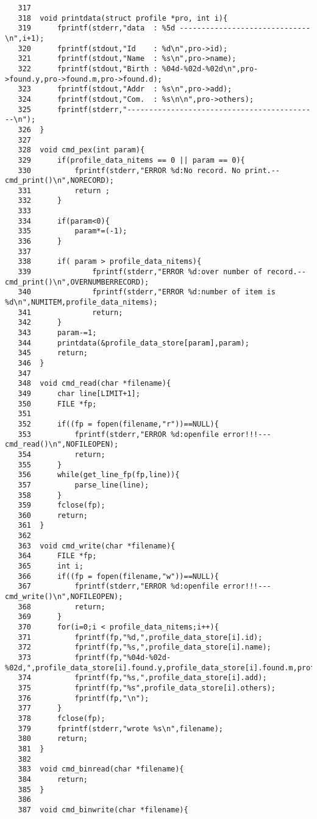 \documentclass[a4j,11pt]{jarticle}
\begin{document}
{\begin{verbatim}
   317	
   318	void printdata(struct profile *pro, int i){
   319	    fprintf(stderr,"data  : %5d ------------------------------\n",i+1);
   320	    fprintf(stdout,"Id    : %d\n",pro->id);
   321	    fprintf(stdout,"Name  : %s\n",pro->name);
   322	    fprintf(stdout,"Birth : %04d-%02d-%02d\n",pro->found.y,pro->found.m,pro->found.d);
   323	    fprintf(stdout,"Addr  : %s\n",pro->add);
   324	    fprintf(stdout,"Com.  : %s\n\n",pro->others);
   325	    fprintf(stderr,"--------------------------------------------\n");
   326	}
   327	
   328	void cmd_pex(int param){
   329	    if(profile_data_nitems == 0 || param == 0){
   330	        fprintf(stderr,"ERROR %d:No record. No print.--cmd_print()\n",NORECORD);
   331	        return ;
   332	    }
   333	
   334	    if(param<0){
   335	        param*=(-1);
   336	    }
   337	
   338	    if( param > profile_data_nitems){
   339	            fprintf(stderr,"ERROR %d:over number of record.--cmd_print()\n",OVERNUMBERRECORD);
   340	            fprintf(stderr,"ERROR %d:number of item is %d\n",NUMITEM,profile_data_nitems);
   341	            return;
   342	    }
   343	    param-=1;
   344	    printdata(&profile_data_store[param],param);
   345	    return;
   346	}
   347	
   348	void cmd_read(char *filename){
   349	    char line[LIMIT+1];
   350	    FILE *fp;
   351	    
   352	    if((fp = fopen(filename,"r"))==NULL){
   353	        fprintf(stderr,"ERROR %d:openfile error!!!---cmd_read()\n",NOFILEOPEN);
   354	        return;
   355	    }
   356	    while(get_line_fp(fp,line)){
   357	        parse_line(line);
   358	    }
   359	    fclose(fp);
   360	    return;
   361	}
   362	
   363	void cmd_write(char *filename){
   364	    FILE *fp;
   365	    int i;
   366	    if((fp = fopen(filename,"w"))==NULL){
   367	        fprintf(stderr,"ERROR %d:openfile error!!!---cmd_write()\n",NOFILEOPEN);
   368	        return;
   369	    }
   370	    for(i=0;i < profile_data_nitems;i++){
   371	        fprintf(fp,"%d,",profile_data_store[i].id);
   372	        fprintf(fp,"%s,",profile_data_store[i].name);
   373	        fprintf(fp,"%04d-%02d-%02d,",profile_data_store[i].found.y,profile_data_store[i].found.m,profile_data_store[i].found.d);
   374	        fprintf(fp,"%s,",profile_data_store[i].add);
   375	        fprintf(fp,"%s",profile_data_store[i].others);
   376	        fprintf(fp,"\n");
   377	    }
   378	    fclose(fp);
   379	    fprintf(stderr,"wrote %s\n",filename);
   380	    return;
   381	}
   382	
   383	void cmd_binread(char *filename){
   384	    return;    
   385	}
   386	
   387	void cmd_binwrite(char *filename){

\end{verbatim}}
\end{document}
